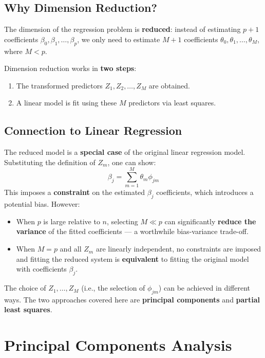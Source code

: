 \documentclass[11pt,a4paper]{article}
\theoremstyle{definition}
\theoremstyle{plain}
\theoremstyle{remark}
\begin{document}
\subsection{Why Dimension Reduction?}

The dimension of the regression problem is \textbf{reduced}: instead of estimating $p + 1$ coefficients $\beta_0, \beta_1, \ldots, \beta_p$, we only need to estimate $M + 1$ coefficients $\theta_0, \theta_1, \ldots, \theta_M$, where $M < p$.

Dimension reduction works in \textbf{two steps}:
\begin{enumerate}
    \item The transformed predictors $Z_1, Z_2, \ldots, Z_M$ are obtained.
    \item A linear model is fit using these $M$ predictors via least squares.
\end{enumerate}

\subsection{Connection to Linear Regression}

The reduced model is a \textbf{special case} of the original linear regression model. Substituting the definition of $Z_m$, one can show:
\[
    \beta_j = \sum_{m=1}^{M} \theta_m \phi_{jm}
\]
This imposes a \textbf{constraint} on the estimated $\beta_j$ coefficients, which introduces a potential bias. However:
\begin{itemize}
    \item When $p$ is large relative to $n$, selecting $M \ll p$ can significantly \textbf{reduce the variance} of the fitted coefficients — a worthwhile bias-variance trade-off.
    \item When $M = p$ and all $Z_m$ are linearly independent, no constraints are imposed and fitting the reduced system is \textbf{equivalent} to fitting the original model with coefficients $\beta_j$.
\end{itemize}

The choice of $Z_1, \ldots, Z_M$ (i.e., the selection of $\phi_{jm}$) can be achieved in different ways. The two approaches covered here are \textbf{principal components} and \textbf{partial least squares}.

\section{Principal Components Analysis}
\end{document}
